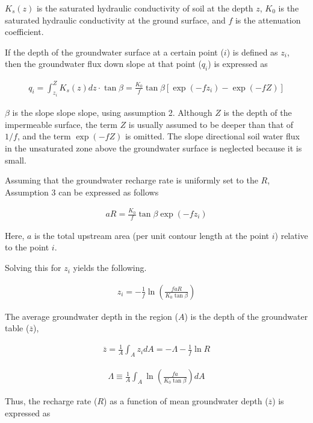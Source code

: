 \(K_s(z)\) is the saturated hydraulic conductivity of soil at the depth
\(z\), \(K_0\) is the saturated hydraulic conductivity at the ground
surface, and \(f\) is the attenuation coefficient.

If the depth of the groundwater surface at a certain point (\(i\)) is
defined as \(z_i\), then the groundwater flux down slope at that point
(\(q_i\)) is expressed as

\begin{eqnarray}
 q_i = \int_{z_i}^Z K_s(z) dz \cdot \tan\beta
   = \frac{K_0}{f}  \tan\beta [\exp(-f z_i) - \exp(-f Z)]
\end{eqnarray}

\(\beta\) is the slope slope slope, using assumption 2. Although \(Z\)
is the depth of the impermeable surface, the term \(Z\) is usually
assumed to be deeper than that of \(1/f\), and the term \(\exp(-f Z)\)
is omitted. The slope directional soil water flux in the unsaturated
zone above the groundwater surface is neglected because it is small.

Assuming that the groundwater recharge rate is uniformly set to the
\(R\), Assumption 3 can be expressed as follows

\begin{eqnarray}
 a R = \frac{K_0}{f} \tan\beta \exp(-f z_i)
\end{eqnarray}

Here, \(a\) is the total upstream area (per unit contour length at the
point \(i\)) relative to the point \(i\).

Solving this for \(z_i\) yields the following.

\begin{eqnarray}
 z_i = -\frac{1}{f} \ln \left( \frac{faR}{K_0 \tan \beta}\right)
\end{eqnarray}

The average groundwater depth in the region (\(A\)) is the depth of the
groundwater table (\(\overline{z}\)),

\begin{eqnarray}
   \overline{z} = \frac1{A}\int_{A} z_i dA
  = - \Lambda - \frac1{f} \ln R
\end{eqnarray}

\begin{eqnarray}
 \Lambda \equiv
  \frac1{A}\int_{A} \ln \left( \frac{fa}{K_0 \tan \beta}\right) dA
\end{eqnarray}

Thus, the recharge rate (\(R\)) as a function of mean groundwater depth
(\(\overline{z}\)) is expressed as

